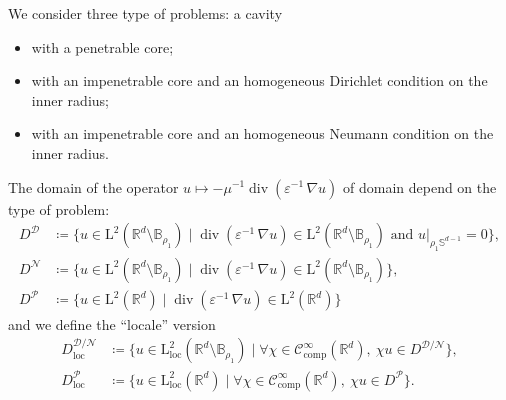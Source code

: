 \documentclass[12pt,a4paper]{article}
\theoremstyle{definition}
\theoremstyle{plain}
\theoremstyle{remark}
\newcommand{\bbB}{\mathbb{B}}
\newcommand{\bbR}{\mathbb{R}}
\newcommand{\bbS}{\mathbb{S}}
\newcommand{\calD}{\mathcal{D}}
\newcommand{\calN}{\mathcal{N}}
\newcommand{\calP}{\mathcal{P}}
\newcommand{\scrC}{\mathscr{C}}
\newcommand{\rmL}{\mathrm{L}}
\DeclareMathOperator{\Div}{div}
\newcommand{\restr}[2]{\left. #1\right\vert_{#2}}
\newcommand{\eps}{\varepsilon}
\newcommand{\comp}{\mathrm{comp}}
\newcommand{\loc}{\mathrm{loc}}
\begin{document}
We consider three type of problems: a cavity
\begin{itemize}
    \item with a penetrable core;
    \item with an impenetrable core and an homogeneous Dirichlet condition on the inner radius;
    \item with an impenetrable core and an homogeneous Neumann condition on the inner radius.
\end{itemize}
The domain of the operator $u \mapsto -\mu^{-1}\Div(\eps^{-1}\, \nabla u)$ of domain depend on the type of problem:
\begin{align*}
    D^\calD & \coloneqq \{u \in \rmL^2(\bbR^d \setminus \bbB_{\rho_1}) \mid \Div(\eps^{-1}\, \nabla u) \in \rmL^2(\bbR^d \setminus \bbB_{\rho_1}) \text{ and } \restr{u}{\rho_1\bbS^{d-1}} = 0\}, \\
    D^\calN & \coloneqq \{u \in \rmL^2(\bbR^d \setminus \bbB_{\rho_1}) \mid \Div(\eps^{-1}\, \nabla u) \in \rmL^2(\bbR^d \setminus \bbB_{\rho_1})\},                                              \\
    D^\calP & \coloneqq \{u \in \rmL^2(\bbR^d) \mid \Div(\eps^{-1}\, \nabla u) \in \rmL^2(\bbR^d)\}
\end{align*}
and we define the ``locale'' version
\begin{align*}
    D_\loc^{\calD/\calN} & \coloneqq \{u \in \rmL_\loc^2(\bbR^d \setminus \bbB_{\rho_1}) \mid \forall \chi \in \scrC_\comp^\infty(\bbR^d),\ \chi u \in D^{\calD/\calN}\}, \\
    D_\loc^\calP         & \coloneqq \{u \in \rmL_\loc^2(\bbR^d) \mid \forall \chi \in \scrC_\comp^\infty(\bbR^d),\ \chi u \in D^\calP\}.
\end{align*}

\bigskip
\end{document}
